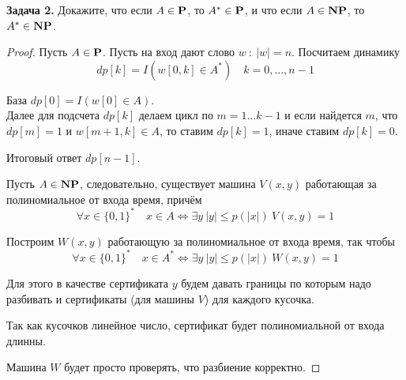 \textbf{Задача 2.} Докажите, что если $A\in\textbf{P}$, то $A^*\in\textbf{P}$, и что если $A\in\textbf{NP}$, то $A^*\in\textbf{NP}$.

\begin{proof} Пусть $A\in\textbf{P}$. Пусть на вход дают слово $w\ : \ |w|=n$. Посчитаем динамику 
\[dp[k] = I\left(w[0,k]\in A^*\right)\quad k=0,\ldots,n-1\]

База $dp[0]=I\left(w[0]\in A\right)$.\\
Далее для подсчета $dp[k]$ делаем цикл по $m=1\ldots k -1$ и если найдется $m$, что $dp[m]=1$ и $w[m+1,k]\in A$, то ставим $dp[k] = 1$, иначе ставим $dp[k] = 0$.

Итоговый ответ $dp[n -1]$.

Пусть $A\in\textbf{NP}$, следовательно, существует машина $V(x,y)$ работающая за полиномиальное от входа время, причём
\[\forall x \in \{0,1\}^*\quad x\in A\iff \exists y\ |y|\le p(|x|)\ V(x,y)=1\]

Построим $W(x,y)$ работающую за полиномиальное от входа время, так чтобы
\[\forall x \in \{0,1\}^*\quad x\in A^*\iff \exists y\ |y|\le p(|x|)\ W(x,y)=1\]

Для этого в качестве сертификата $y$ будем давать границы по которым надо разбивать и сертификаты (для машины $V$) для каждого кусочка.

Так как кусочков линейное число, сертификат будет полиномиальной от входа длинны.

Машина $W$ будет просто проверять, что разбиение корректно.
\end{proof}